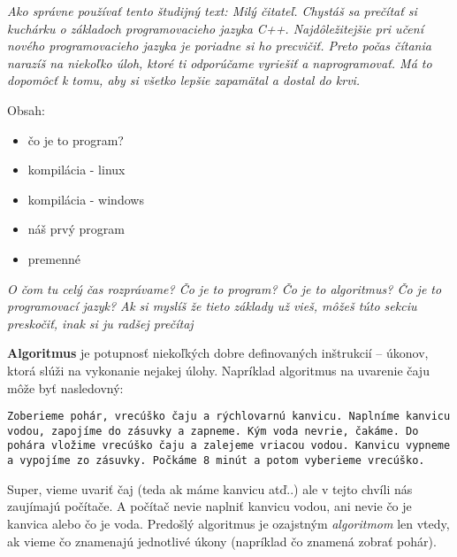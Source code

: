 




\textit{Ako správne používať tento študijný text: Milý čitateľ. Chystáš sa prečítať si kuchárku o
základoch programovacieho jazyka C++. Najdôležitejšie pri učení nového programovacieho jazyka 
je poriadne si ho precvičiť. Preto počas čítania narazíš na niekoľko úloh, ktoré ti odporúčame vyriešiť a naprogramovať.
Má to dopomôcť k tomu, aby si všetko lepšie zapamätal a dostal do krvi.}

Obsah:
\begin{itemize}
    \item čo je to program?
    \item kompilácia - linux
    \item kompilácia - windows %
    \item náš prvý program
    \item premenné
\end{itemize}

\medskip

\textit{O čom tu celý čas rozprávame? Čo je to program? Čo je to algoritmus? Čo je to programovací jazyk?
Ak si myslíš že tieto základy už vieš, môžeš túto sekciu preskočiť, inak si ju radšej prečítaj}

\textbf{Algoritmus} je potupnosť niekoľkých dobre definovaných inštrukcií -- úkonov, ktorá slúži na vykonanie nejakej úlohy.
Napríklad algoritmus na uvarenie čaju môže byť nasledovný:

\texttt{Zoberieme pohár, vrecúško čaju a rýchlovarnú kanvicu. Naplníme kanvicu vodou, zapojíme do zásuvky a zapneme. Kým voda nevrie, čakáme. 
Do pohára vložime vrecúško čaju a zalejeme vriacou vodou. Kanvicu vypneme a vypojíme zo zásuvky. Počkáme 8 minút a potom vyberieme vrecúško.}

Super, vieme uvariť čaj (teda ak máme kanvicu atď..) ale v tejto chvíli nás zaujímajú počítače. A počítač nevie naplniť kanvicu vodou,
ani nevie čo je kanvica alebo čo je voda. Predošlý algoritmus je ozajstným \emph{algoritmom} len vtedy, ak vieme čo znamenajú jednotlivé úkony 
(napríklad čo znamená zobrať pohár). 

\medskip

